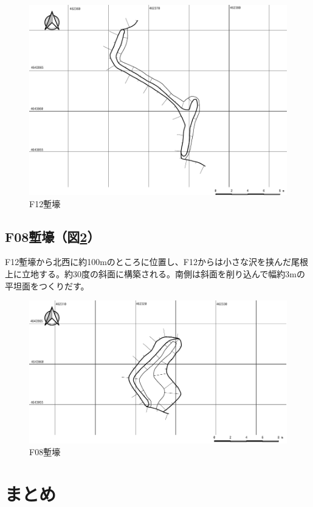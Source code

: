 \documentclass[14Q]{jsarticle}
\begin{document}
\begin{figure}[h]
\centering
\includegraphics[width=160truemm]{fig/F12.pdf}
\caption{F12塹壕}
\label{f12}
\end{figure}

\subsection{F08塹壕（図\ref{f08}）}
F12塹壕から北西に約100mのところに位置し、F12からは小さな沢を挟んだ尾根上に立地する。約30度の斜面に構築される。南側は斜面を削り込んで幅約3mの平坦面をつくりだす。

\begin{figure}[h]
\centering
\includegraphics[width=160truemm]{fig/F08.pdf}
\caption{F08塹壕}
\label{f08}
\end{figure}

\section{まとめ}
\end{document}
